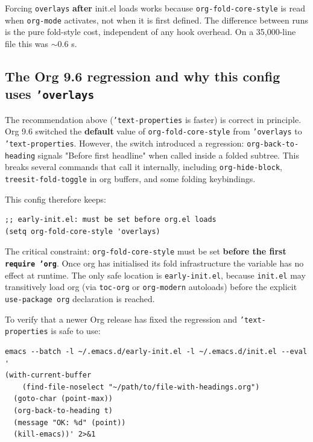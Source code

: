 Forcing \texttt{overlays} \textbf{after} init.el loads works because \texttt{org-fold-core-style} is read when \texttt{org-mode} activates, not when it is first defined. The difference between runs is the pure fold-style cost, independent of any hook overhead. On a 35,000-line file this was \(\sim\)0.6 s.

\subsection{The Org 9.6 regression and why this config uses \texttt{'overlays}}\label{the-org-9.6-regression-and-why-this-config-uses-overlays}

The recommendation above (\texttt{'text-properties} is faster) is correct in principle. Org 9.6 switched the \textbf{default} value of \texttt{org-fold-core-style} from \texttt{'overlays} to \texttt{'text-properties}. However, the switch introduced a regression: \texttt{org-back-to-heading} signals "Before first headline" when called inside a folded subtree. This breaks several commands that call it internally, including \texttt{org-hide-block}, \texttt{treesit-fold-toggle} in org buffers, and some folding keybindings.

This config therefore keeps:

\begin{verbatim}
;; early-init.el: must be set before org.el loads
(setq org-fold-core-style 'overlays)
\end{verbatim}

The critical constraint: \texttt{org-fold-core-style} must be set \textbf{before the first \texttt{require 'org}}. Once org has initialised its fold infrastructure the variable has no effect at runtime. The only safe location is \texttt{early-init.el}, because \texttt{init.el} may transitively load org (via \texttt{toc-org} or \texttt{org-modern} autoloads) before the explicit \texttt{use-package org} declaration is reached.

To verify that a newer Org release has fixed the regression and \texttt{'text-properties} is safe to use:

\begin{verbatim}
emacs --batch -l ~/.emacs.d/early-init.el -l ~/.emacs.d/init.el --eval '
(with-current-buffer
    (find-file-noselect "~/path/to/file-with-headings.org")
  (goto-char (point-max))
  (org-back-to-heading t)
  (message "OK: %d" (point))
  (kill-emacs))' 2>&1
\end{verbatim}


